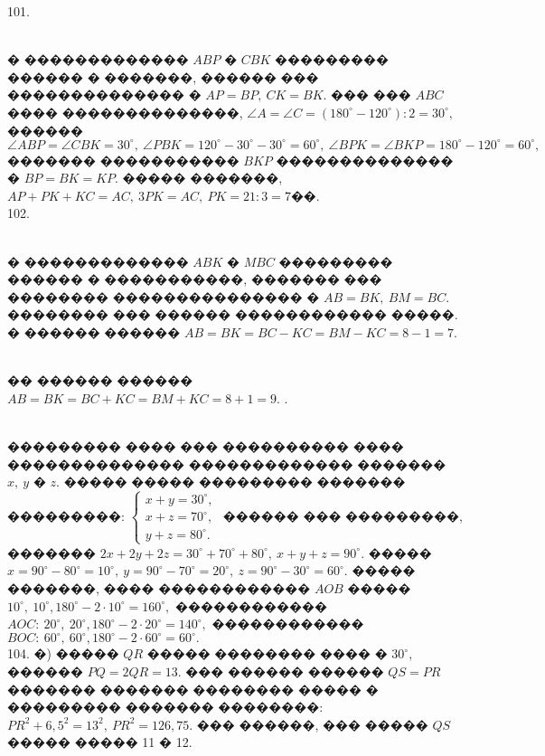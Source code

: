 \documentclass[12pt]{article}
\begin{document}
101. \begin{figure}[ht!]
\end{figure}\\
� ������������� $ABP$ � $CBK$ ��������� ������ � �������, ������ ��� �������������� � $AP=BP,\ CK=BK.$ ��� ��� $ABC$ ���� ��������������, $\angle A=\angle C=(180^\circ-120^\circ):2=30^\circ,$ ������ $\angle ABP=\angle CBK=30^\circ,\ \angle PBK=120^\circ-30^\circ-30^\circ=60^\circ,\ \angle BPK=\angle BKP=180^\circ-120^\circ=60^\circ,$ ������� ����������� $BKP$ �������������� � $BP=BK=KP.$ ����� �������, $AP+PK+KC=AC,\ 3PK=AC,\ PK=21:3=7$��.\\
102. \begin{figure}[ht!]
\end{figure}\\
� ������������� $ABK$ � $MBC$ ��������� ������ � �����������, ������� ��� �������� ��������������� � $AB=BK,\ BM=BC.$ �������� ��� ������ ������������ �����. � ������ ������ $AB=BK=BC-KC=BM-KC=8-1=7.$
 \begin{figure}[ht!]
\end{figure}\\
�� ������ ������ $AB=BK=BC+KC=BM+KC=8+1=9.$\newpage
{}.\begin{figure}[ht!]
\end{figure}\\
��������� ���� ��� ���������� ���� �������������� ������������� ������� $x,\ y$ � $z.$ ����� ����� ��������� ������� ���������: $\begin{cases}x+y=30^\circ,\\
x+z=70^\circ,\\ y+z=80^\circ.\end{cases}$ ������ ��� ���������, ������� $2x+2y+2z=30^\circ+70^\circ+80^\circ,\ x+y+z=90^\circ.$ ����� $x=90^\circ-80^\circ=10^\circ,\ y=90^\circ-70^\circ=20^\circ,\ z=90^\circ-30^\circ=60^\circ.$ ����� �������, ���� ������������ $AOB$ ����� $10^\circ,\ 10^\circ, 180^\circ-2\cdot10^\circ=160^\circ,$ ������������ $AOC:\ 20^\circ,\ 20^\circ, 180^\circ-2\cdot20^\circ=140^\circ,$ ������������ $BOC:\ 60^\circ,\ 60^\circ, 180^\circ-2\cdot60^\circ=60^\circ.$\\
104. �) ����� $QR$ ����� �������� ���� � $30^\circ,$ ������ $PQ=2QR=13.$ ��� ������ ������ $QS=PR$ ������� ������� �������� ����� � ��������� ������� ��������: $PR^2+6,5^2=13^2,\ PR^2=126,75.$ ��� ������, ��� ����� $QS$ ����� ����� 11 � 12.\\
\end{document}
